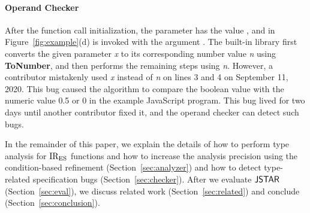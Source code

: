 \paragraph{Operand Checker} After the function call initialization, the
parameter  has the value , and  in Figure~\ref{fig:example}(d) is invoked
with the argument .  The  built-in library first
converts the given parameter \textit{x} to its corresponding number value
\textit{n} using \textbf{ToNumber}, and then performs the remaining
steps using \textit{n}.  However, a contributor mistakenly used
\textit{x} instead of \textit{n} on lines 3 and 4 on September 11, 2020.
This bug caused the algorithm to compare the boolean value  with the
numeric value 0.5 or 0 in the example JavaScript program.
This bug lived for two days until another contributor fixed it, and
the operand checker can detect such bugs.

In the remainder of this paper, we explain the details of how to perform type
analysis for ${\text{IR}_\text{ES}}$ functions and how to increase the analysis precision using
the condition-based refinement (Section~\ref{sec:analyzer}) and how to detect
type-related specification bugs (Section~\ref{sec:checker}).  After we evaluate $\tool$
(Section~\ref{sec:eval}), we discuss related work (Section~\ref{sec:related})
and conclude (Section~\ref{sec:conclusion}).
